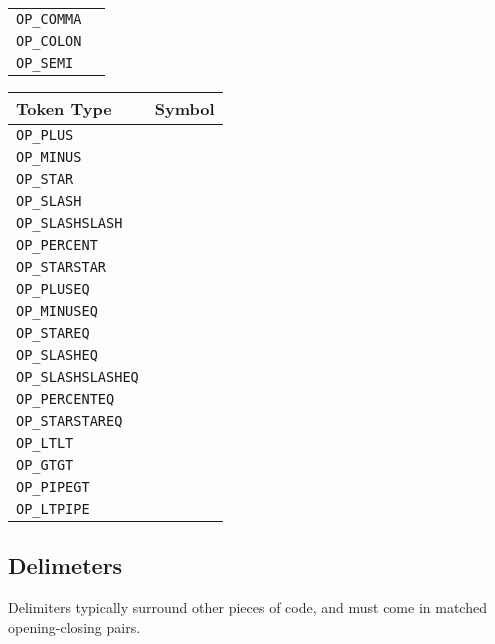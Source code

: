 \begin{table}[H]
{\begin{tabular}[t]{|ll|}
        \texttt{OP\_COMMA} & \op{,} \\
        \texttt{OP\_COLON} & \op{:} \\
        \texttt{OP\_SEMI} & \op{;} \\
        \hline
    \end{tabular}
}
\hfill
\parbox[t]{0.45\linewidth}{
    \centering
    \begin{tabular}[t]{|ll|}
        \hline
        \textbf{Token Type} & \textbf{Symbol} \\
        \hline
        \texttt{OP\_PLUS} & \op{+} \\
        \texttt{OP\_MINUS} & \op{-} \\
        \texttt{OP\_STAR} & \op{*} \\
        \texttt{OP\_SLASH} & \op{/} \\
        \texttt{OP\_SLASHSLASH} & \op{//} \\
        \texttt{OP\_PERCENT} & \op{\%} \\
        \texttt{OP\_STARSTAR} & \op{**} \\
        \hline
        \texttt{OP\_PLUSEQ} & \op{+=} \\
        \texttt{OP\_MINUSEQ} & \op{-=} \\
        \texttt{OP\_STAREQ} & \op{*=} \\
        \texttt{OP\_SLASHEQ} & \op{/=} \\
        \texttt{OP\_SLASHSLASHEQ} & \op{//=} \\
        \texttt{OP\_PERCENTEQ} & \op{\%=} \\
        \texttt{OP\_STARSTAREQ} & \op{**=} \\
        \hline
        \texttt{OP\_LTLT} & \op{<<} \\
        \texttt{OP\_GTGT} & \op{>>} \\
        \texttt{OP\_PIPEGT} & \op{|>} \\
        \texttt{OP\_LTPIPE} & \op{<|} \\
        \hline
    \end{tabular}
}
\end{table}

\subsection{Delimeters}

Delimiters typically surround other pieces of code, and must come in
matched opening-closing pairs.

